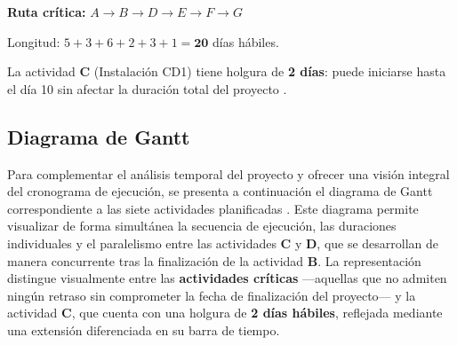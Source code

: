 \documentclass[12pt,a4paper]{article}
\begin{document}
\begin{cajares}
\textbf{Ruta cr\'{i}tica:} $A \to B \to D \to E \to F \to G$

Longitud: $5 + 3 + 6 + 2 + 3 + 1 = \mathbf{20}$ d\'{i}as h\'{a}biles.

La actividad \textbf{C} (Instalaci\'{o}n CD1) tiene holgura de \textbf{2 d\'{i}as}: puede
iniciarse hasta el d\'{i}a 10 sin afectar la duraci\'{o}n total del proyecto \cite{taha2012}.
\end{cajares}

\subsection{Diagrama de Gantt}

Para complementar el an\'{a}lisis temporal del proyecto y ofrecer una visi\'{o}n integral 
del cronograma de ejecuci\'{o}n, se presenta a continuaci\'{o}n el diagrama de Gantt 
correspondiente a las siete actividades planificadas \cite{render2012}. Este diagrama permite 
visualizar de forma simult\'{a}nea la secuencia de ejecuci\'{o}n, las duraciones individuales 
y el paralelismo entre las actividades \textbf{C} y \textbf{D}, que se desarrollan de manera 
concurrente tras la finalizaci\'{o}n de la actividad \textbf{B}. La representaci\'{o}n 
distingue visualmente entre las \textbf{actividades cr\'{i}ticas} ---aquellas que no admiten 
ning\'{u}n retraso sin comprometer la fecha de finalizaci\'{o}n del proyecto--- y la actividad 
\textbf{C}, que cuenta con una holgura de \textbf{2 d\'{i}as h\'{a}biles}, reflejada mediante 
una extensi\'{o}n diferenciada en su barra de tiempo.
\end{document}
